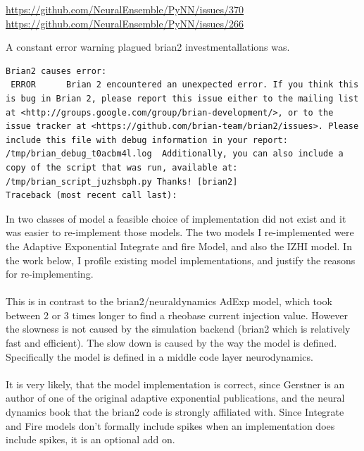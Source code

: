 

\url{https://github.com/NeuralEnsemble/PyNN/issues/370} 
\url{https://github.com/NeuralEnsemble/PyNN/issues/266} 
 
A constant error warning plagued brian2 investmentallations was.
\begin{verbatim}
Brian2 causes error:
 ERROR      Brian 2 encountered an unexpected error. If you think this is bug in Brian 2, please report this issue either to the mailing list at <http://groups.google.com/group/brian-development/>, or to the issue tracker at <https://github.com/brian-team/brian2/issues>. Please include this file with debug information in your report: /tmp/brian_debug_t0acbm4l.log  Additionally, you can also include a copy of the script that was run, available at: /tmp/brian_script_juzhsbph.py Thanks! [brian2]
Traceback (most recent call last):
\end{verbatim}
In two classes of model a feasible choice of implementation did not exist and it was easier to re-implement those models. The two models I re-implemented were
the Adaptive Exponential Integrate and fire Model, and also the IZHI
model.  In the work below, I profile existing model implementations, and
justify the reasons for re-implementing.\\
\\
This is in contrast to the brian2/neuraldynamics AdExp model, which took
between 2 or 3 times longer to find a rheobase current injection value. However the slowness is not caused by the simulation backend (brian2 which is relatively fast and efficient). The slow down is caused by the way the model is defined. Specifically the
model is defined in a middle code layer neurodynamics\cite{gerstner2014neuronal}.\\
\\
It is very likely, that the model implementation is correct, since Gerstner is an author of one of the original adaptive exponential publications, and the neural dynamics book that the brian2 code is strongly affiliated with. Since Integrate and Fire models don't formally include spikes when an implementation does include spikes, it is an optional add on.\\
